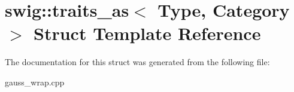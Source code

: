 \hypertarget{structswig_1_1traits__as}{\section{swig\-:\-:traits\-\_\-as$<$ Type, Category $>$ Struct Template Reference}
\label{structswig_1_1traits__as}
}


The documentation for this struct was generated from the following file\-:\begin{DoxyCompactItemize}
\item 
gauss\-\_\-wrap.\-cpp\end{DoxyCompactItemize}
